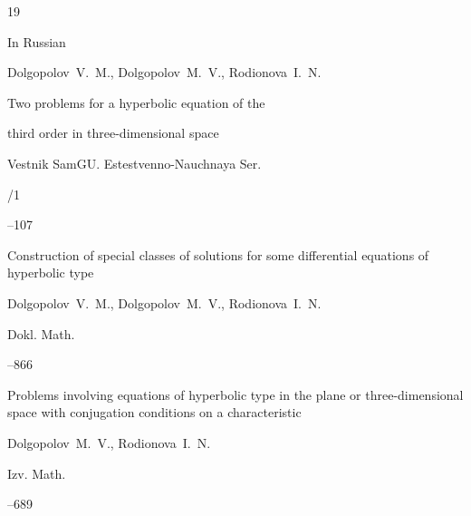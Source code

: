 \begin{thebibliography}{19}




\lang In Russian

\by Dolgopolov~V.~M., Dolgopolov~M.~V., Rodionova~I.~N.

\paper Two problems for a hyperbolic equation of the

third order in three-dimensional space

\jour Vestnik SamGU. Estestvenno-Nauchnaya Ser.



/1

--107




\paper Construction of special classes of solutions for some differential equations of hyperbolic type

\by Dolgopolov~V.~M., Dolgopolov~M.~V., Rodionova~I.~N.

\jour Dokl. Math. 




--866









\paper Problems involving equations of hyperbolic type in the plane or three-dimensional space with conjugation conditions on a characteristic

\by Dolgopolov~M.~V., Rodionova~I.~N.

\jour Izv. Math.




--689



\end{thebibliography}
